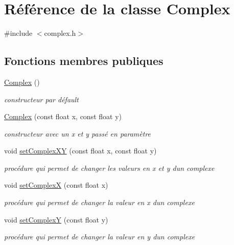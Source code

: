 \hypertarget{classComplex}{}\section{Référence de la classe Complex}
\label{classComplex}


{\ttfamily \#include $<$complex.\+h$>$}

\subsection*{Fonctions membres publiques}
\begin{DoxyCompactItemize}
\item 
\hyperlink{classComplex_a43b9f07cdf697c71b5fd506a6cc80b8f}{Complex} ()
\begin{DoxyCompactList}\small\item\em constructeur par défault \end{DoxyCompactList}\item 
\hyperlink{classComplex_a7aecdf154c80482286a9d3d01a805bc0}{Complex} (const float x, const float y)
\begin{DoxyCompactList}\small\item\em constructeur avec un x et y passé en paramètre \end{DoxyCompactList}\item 
void \hyperlink{classComplex_ab72421580500156ec1e421c443ac636b}{set\+Complex\+XY} (const float x, const float y)
\begin{DoxyCompactList}\small\item\em procédure qui permet de changer les valeurs en x et y d\textquotesingle{}un complexe \end{DoxyCompactList}\item 
void \hyperlink{classComplex_a8a2882e0732b0744947010d2af9dd3a0}{set\+ComplexX} (const float x)
\begin{DoxyCompactList}\small\item\em procédure qui permet de changer la valeur en x d\textquotesingle{}un complexe \end{DoxyCompactList}\item 
void \hyperlink{classComplex_aae1f9f4c418b86ea62008e7ccc8a03f0}{set\+ComplexY} (const float y)
\begin{DoxyCompactList}\small\item\em procédure qui permet de changer la valeur en y d\textquotesingle{}un complexe \end{DoxyCompactList}\item 

\end{DoxyCompactItemize}
